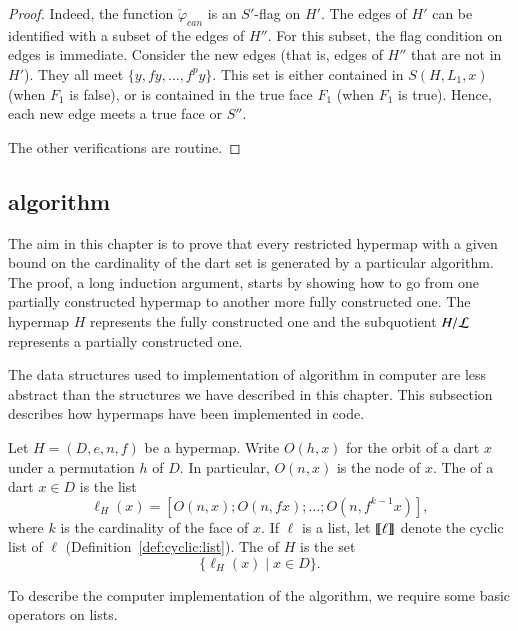 \begin{proof}
   Indeed, the
function $\check\varphi_{can}$ is an $S'$-flag on $H'$.  The edges of
$H'$ can be identified with a subset of the edges of $H''$.  For this
subset, the flag condition on edges is immediate.  Consider the new
edges (that is, edges of $H''$ that are not in $H'$).  They all meet
$\{y,f y,\ldots,f^p y\}$.  This set is either contained in
$S(H,L_1,x)$ (when $F_1$ is false), or is contained in the true face
$F_1$ (when $F_1$ is true).  Hence, each new edge meets a true face or
$S''$.


The other verifications are routine.
\end{proof}


\subsection{algorithm}\label{sec:hypermap-algorithm}

The aim in this chapter is to prove that every restricted hypermap
with a given bound on the cardinality of the dart set is generated by
a particular algorithm.  The proof, a long induction argument, starts
by showing how to go from one partially constructed hypermap to
another more fully constructed one.  The hypermap $H$ represents the
fully constructed one and the subquotient $H/{\cal L}$ represents a
partially constructed one.

The data structures used to implementation of algorithm in computer
are less abstract than the structures we have described in this
chapter.  This subsection describes how hypermaps have been
implemented in code.


\begin{definition}[listing]
  Let $H=(D,e,n,f)$ be a hypermap.  Write $O(h,x)$ for the orbit of a
  dart $x$ under a permutation $h$ of $D$.  In particular, $O(n,x)$ is
  the node of $x$.  The  of a dart $x\in D$ is the
  list
\[
\ell_H(x) = [O(n,x);O(n,f x);\ldots;O(n,f^{k-1} x)   ], 
\]
where $k$ is the cardinality of the face of $x$.  If $\ell$ is a list,
let ${\llbracket{\ell}\rrbracket}$ denote the cyclic list of $\ell$
(Definition~\ref{def:cyclic:list}).  The  of $H$ is
the set
\[
\{\ell_H(x) \mid x\in D\}.
\]
\end{definition}

To describe the computer implementation of the algorithm, we require
some basic operators on lists.

